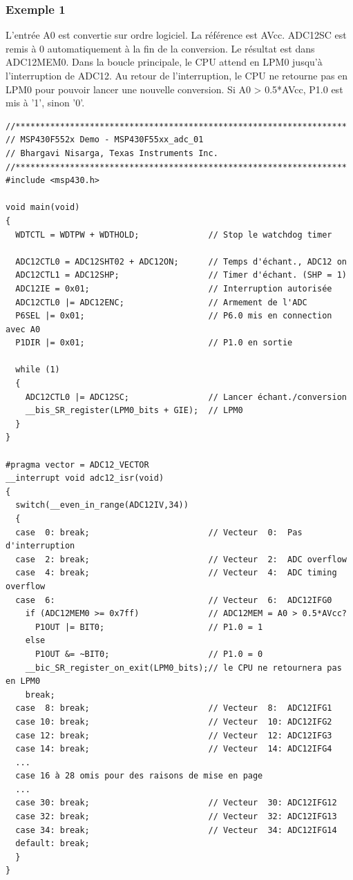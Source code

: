 \begin{minipage}{16cm}{
\subsubsection*{Exemple 1}
L'entrée A0 est convertie sur ordre logiciel. La référence est AVcc. ADC12SC est remis à 0 automatiquement à la fin de la conversion. Le résultat est dans ADC12MEM0. Dans la boucle principale, le CPU attend en LPM0 jusqu'à l'interruption de ADC12. Au retour de l'interruption, le CPU ne retourne pas en LPM0 pour pouvoir lancer une nouvelle conversion. Si A0 > 0.5*AVcc, P1.0 est mis à '1', sinon '0'.

\lstset{style=customc}
\begin{lstlisting}
//*******************************************************************
// MSP430F552x Demo - MSP430F55xx_adc_01
// Bhargavi Nisarga, Texas Instruments Inc.
//*******************************************************************
#include <msp430.h>

void main(void)
{
  WDTCTL = WDTPW + WDTHOLD;              // Stop le watchdog timer

  ADC12CTL0 = ADC12SHT02 + ADC12ON;      // Temps d'échant., ADC12 on
  ADC12CTL1 = ADC12SHP;                  // Timer d'échant. (SHP = 1)
  ADC12IE = 0x01;                        // Interruption autorisée
  ADC12CTL0 |= ADC12ENC;                 // Armement de l'ADC
  P6SEL |= 0x01;                         // P6.0 mis en connection avec A0
  P1DIR |= 0x01;                         // P1.0 en sortie

  while (1)
  {
    ADC12CTL0 |= ADC12SC;                // Lancer échant./conversion
    __bis_SR_register(LPM0_bits + GIE);  // LPM0
  }
}

#pragma vector = ADC12_VECTOR
__interrupt void adc12_isr(void)
{
  switch(__even_in_range(ADC12IV,34))
  {
  case  0: break;                        // Vecteur  0:  Pas d'interruption
  case  2: break;                        // Vecteur  2:  ADC overflow
  case  4: break;                        // Vecteur  4:  ADC timing overflow
  case  6:                               // Vecteur  6:  ADC12IFG0
    if (ADC12MEM0 >= 0x7ff)              // ADC12MEM = A0 > 0.5*AVcc?
      P1OUT |= BIT0;                     // P1.0 = 1
    else
      P1OUT &= ~BIT0;                    // P1.0 = 0
    __bic_SR_register_on_exit(LPM0_bits);// le CPU ne retournera pas en LPM0
    break;
  case  8: break;                        // Vecteur  8:  ADC12IFG1
  case 10: break;                        // Vecteur  10: ADC12IFG2
  case 12: break;                        // Vecteur  12: ADC12IFG3
  case 14: break;                        // Vecteur  14: ADC12IFG4
  ...
  case 16 à 28 omis pour des raisons de mise en page
  ...
  case 30: break;                        // Vecteur  30: ADC12IFG12
  case 32: break;                        // Vecteur  32: ADC12IFG13
  case 34: break;                        // Vecteur  34: ADC12IFG14
  default: break; 
  }
}
\end{lstlisting}
}
\end{minipage}

